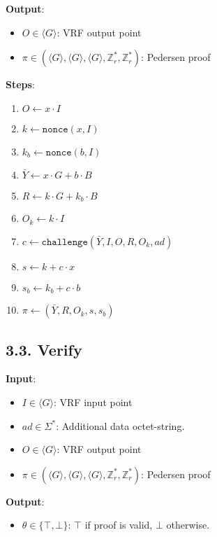 \documentclass[
]{article}
\providecommand{\tightlist}{%
  \setlength{\itemsep}{0pt}\setlength{\parskip}{0pt}}
\begin{document}
\textbf{Output}:

\begin{itemize}
\tightlist
\item
  \(O \in \langle G \rangle\): VRF output point
\item
  \(\pi \in (\langle G \rangle, \langle G \rangle, \langle G \rangle, \mathbb{Z}^*_r, \mathbb{Z}^*_r)\):
  Pedersen proof
\end{itemize}

\textbf{Steps}:

\begin{enumerate}
\def\labelenumi{\arabic{enumi}.}
\tightlist
\item
  \(O \gets x \cdot I\)
\item
  \(k \gets \texttt{nonce}(x, I)\)
\item
  \(k_b \gets \texttt{nonce}(b, I)\)
\item
  \(\bar{Y} \gets x \cdot G + b \cdot B\)
\item
  \(R \gets k \cdot G + k_b \cdot B\)
\item
  \(O_k \gets k \cdot I\)
\item
  \(c \gets \texttt{challenge}(\bar{Y}, I, O, R, O_k, ad)\)
\item
  \(s \gets k + c \cdot x\)
\item
  \(s_b \gets k_b + c \cdot b\)
\item
  \(\pi \gets (\bar{Y}, R, O_k, s, s_b)\)
\end{enumerate}

\hypertarget{verify-1}{%
\subsection{3.3. Verify}\label{verify-1}}

\textbf{Input}:

\begin{itemize}
\tightlist
\item
  \(I \in \langle G \rangle\): VRF input point
\item
  \(ad \in \Sigma^*\): Additional data octet-string.
\item
  \(O \in \langle G \rangle\): VRF output point
\item
  \(\pi \in (\langle G \rangle, \langle G \rangle, \langle G \rangle, \mathbb{Z}^*_r, \mathbb{Z}^*_r)\):
  Pedersen proof
\end{itemize}

\textbf{Output}:

\begin{itemize}
\tightlist
\item
  \(\theta \in \{ \top, \bot \}\): \(\top\) if proof is valid, \(\bot\)
  otherwise.
\end{itemize}
\end{document}
